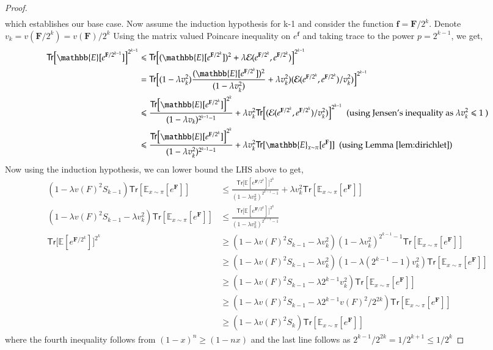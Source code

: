 \begin{proof}
\begin{align*}
\end{align*}
which establishes our base case.
Now assume the induction hypothesis for k-1 and consider the function $\mathbf{f}=\mathbf{F}/2^k$. Denote $v_k = v(\mathbf{F}/2^{k}) = v(\mathbf{F})/2^k$ Using the matrix valued Poincare inequality on $e^\mathbf{f}$ and taking trace to the power $p=2^{k-1}$, we get,
\begin{align*}
  \mathsf{Tr}\big[\mathbb{E}[e^{\mathbf{F}/{2^{k-1}}}]\big]^{2^{k-1}} &\leq \mathsf{Tr}\big[(\mathbb{E}[e^{\mathbf{F}/2^{k}}])^2 + \lambda\mathcal{E}(e^{\mathbf{F}/2^k},e^{\mathbf{F}/2^k})\big]^{2^{k-1}}\\
  &=\mathsf{Tr}\big[(1-\lambda v_k^2 )\frac{(\mathbb{E}[e^{\mathbf{F}/2^{k}}])^2}{(1-\lambda v_k^2)} + \lambda v_k^2)(\mathcal{E}(e^{\mathbf{F}/2^k},e^{\mathbf{F}/2^k})/v_k^2)\big]^{2^{k-1}}\\
  &\leq \frac{\mathsf{Tr}\big[\mathbb{E}[e^{\mathbf{F}/2^{k}}]\big]^{2^k}}{(1-\lambda v_k)^{2^{k-1}-1}} + \lambda v_k^2\mathsf{Tr}\big[(\mathcal{E}(e^{\mathbf{F}/2^k},e^{\mathbf{F}/2^k})/v_k^2)\big]^{2^{k-1}}\ \ \text{(using Jensen's inequality as }\lambda v_k^2 \leq 1 \text{ )}\\
  &\leq \frac{\mathsf{Tr}\big[\mathbb{E}[e^{\mathbf{F}/2^{k}}]\big]^{2^k}}{(1-\lambda v_k^2)^{2^{k-1}-1}} + \lambda v_k^2\mathsf{Tr}[\mathbb{E}_{x \sim \pi}[e^{\mathbf{F}}]] \ \ \text{(using Lemma \ref{lem:dirichlet})}
\end{align*}
Now using the induction hypothesis, we can lower bound the LHS above to get,
\begin{align*}
  (1-\lambda v(F)^2 S_{k-1})\mathsf{Tr}[\mathbb{E}_{x\sim\pi}[e^\mathbf{F}]] &\leq \frac{\mathsf{Tr}\big[\mathbb{E}[e^{\mathbf{F}/2^{k}}]\big]^{2^k}}{(1-\lambda v_k^2)^{2^{k-1}-1}}+ \lambda v_k^2\mathsf{Tr}[\mathbb{E}_{x \sim \pi}[e^{\mathbf{F}}]]\\
  (1-\lambda v(F)^2 S_{k-1}-\lambda v_k^2)\mathsf{Tr}[\mathbb{E}_{x\sim\pi}[e^\mathbf{F}]]&\leq \frac{\mathsf{Tr}\big[\mathbb{E}[e^{\mathbf{F}/2^{k}}]\big]^{2^k}}{(1-\lambda v_k^2)^{2^{k-1}-1}}\\
  \mathsf{Tr}\big[\mathbb{E}[e^{\mathbf{F}/2^{k}}]\big]^{2^k}&\geq(1-\lambda v(F)^2 S_{k-1}-\lambda v_k^2)(1-\lambda v_k^2)^{2^{k-1}-1}\mathsf{Tr}[\mathbb{E}_{x\sim\pi}[e^\mathbf{F}]]\\
  &\geq(1-\lambda v(F)^2 S_{k-1}-\lambda v_k^2)(1-\lambda (2^{k-1}-1)v_k^2)\mathsf{Tr}[\mathbb{E}_{x\sim\pi}[e^\mathbf{F}]] \\
   &\geq (1-\lambda v(F)^2 S_{k-1}-\lambda 2^{k-1} v_k^2)\mathsf{Tr}[\mathbb{E}_{x\sim\pi}[e^\mathbf{F}]]\\
   &\geq (1-\lambda v(F)^2 S_{k-1}-\lambda 2^{k-1} v(F)^2/2^{2k})\mathsf{Tr}[\mathbb{E}_{x\sim\pi}[e^\mathbf{F}]]\\
   &\geq (1-\lambda v(F)^2 S_{k})\mathsf{Tr}[\mathbb{E}_{x\sim\pi}[e^\mathbf{F}]]
\end{align*}
where the fourth inequality follows from $(1-x)^n\geq(1-nx)$ and the last line follows as $2^{k-1}/2^{2k} = 1/2^{k+1} \leq 1/2^k$
\end{proof}
